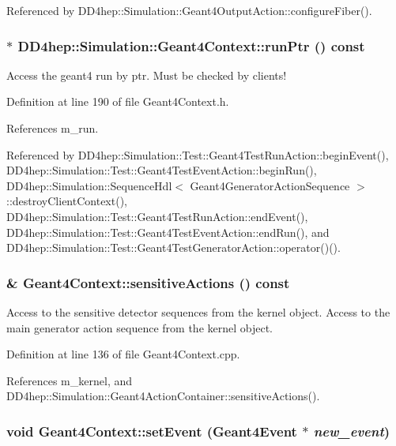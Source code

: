 Referenced by DD4hep::Simulation::Geant4OutputAction::configureFiber().\hypertarget{class_d_d4hep_1_1_simulation_1_1_geant4_context_a05ad84f9bc8f1f3dc8ab22416b002529}{
\subsubsection[{runPtr}]{$\ast$ DD4hep::Simulation::Geant4Context::runPtr () const}}
\label{class_d_d4hep_1_1_simulation_1_1_geant4_context_a05ad84f9bc8f1f3dc8ab22416b002529}


Access the geant4 run by ptr. Must be checked by clients! 

Definition at line 190 of file Geant4Context.h.

References m\_\-run.

Referenced by DD4hep::Simulation::Test::Geant4TestRunAction::beginEvent(), DD4hep::Simulation::Test::Geant4TestEventAction::beginRun(), DD4hep::Simulation::SequenceHdl$<$ Geant4GeneratorActionSequence $>$::destroyClientContext(), DD4hep::Simulation::Test::Geant4TestRunAction::endEvent(), DD4hep::Simulation::Test::Geant4TestEventAction::endRun(), and DD4hep::Simulation::Test::Geant4TestGeneratorAction::operator()().\hypertarget{class_d_d4hep_1_1_simulation_1_1_geant4_context_a0c2bae0f1ec60b88ff9db373e0cfe0b4}{
\subsubsection[{sensitiveActions}]{ \& Geant4Context::sensitiveActions () const}}
\label{class_d_d4hep_1_1_simulation_1_1_geant4_context_a0c2bae0f1ec60b88ff9db373e0cfe0b4}


Access to the sensitive detector sequences from the kernel object. Access to the main generator action sequence from the kernel object. 

Definition at line 136 of file Geant4Context.cpp.

References m\_\-kernel, and DD4hep::Simulation::Geant4ActionContainer::sensitiveActions().\hypertarget{class_d_d4hep_1_1_simulation_1_1_geant4_context_aa0bb03714fc9c82ed1d07ca804b73553}{
\subsubsection[{setEvent}]{\setlength{\rightskip}{0pt plus 5cm}void Geant4Context::setEvent ({\bf Geant4Event} $\ast$ {\em new\_\-event})}}
\label{class_d_d4hep_1_1_simulation_1_1_geant4_context_aa0bb03714fc9c82ed1d07ca804b73553}


